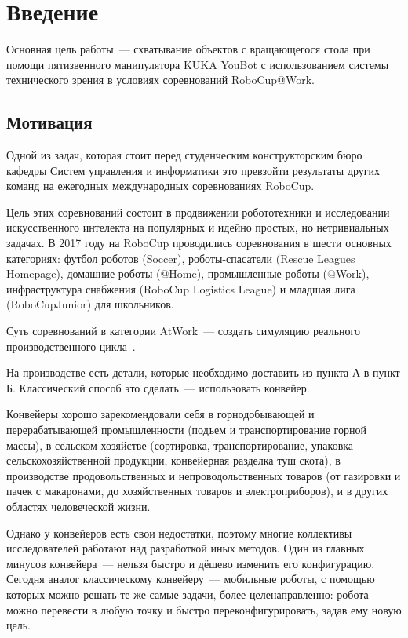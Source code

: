 \section*{Введение}

Основная цель работы~--- схватывание объектов с вращающегося стола  при помощи пятизвенного манипулятора KUKA YouBot с использованием системы технического зрения в условиях соревнований RoboCup@Work.


\subsection*{Мотивация}

Одной из задач, которая стоит перед студенческим конструкторским бюро кафедры Систем управления и информатики это превзойти результаты других команд на ежегодных международных соревнованиях RoboCup.

Цель этих соревнований состоит в продвижении робототехники и исследовании искусственного интелекта на популярных и идейно простых, но нетривиальных задачах. В 2017 году на RoboCup проводились соревнования в шести основных категориях: футбол роботов (Soccer), роботы-спасатели (Rescue Leagues Homepage), домашние роботы (@Home), промышленные роботы (@Work), инфраструктура снабжения (RoboCup Logistics League) и младшая лига (RoboCupJunior) для школьников. 

Суть соревнований в категории AtWork~--- создать симуляцию реального производственного цикла~\cite{kraetzschmar2014robocup}. 

На производстве есть детали, которые необходимо доставить из пункта А в пункт Б. Классический способ это сделать~--- использовать конвейер. 

Конвейеры хорошо зарекомендовали себя в горнодобывающей и перерабатывающей промышленности (подъем и транспортирование горной массы), в сельском хозяйстве (сортировка, транспортирование, упаковка сельскохозяйственной продукции, конвейерная разделка туш скота), в производстве продовольственных и непроводольственных товаров (от газировки и пачек с макаронами, до хозяйственных товаров и электроприборов), и в других областях человеческой жизни.%

Однако у конвейеров есть свои недостатки, поэтому многие коллективы исследователей работают над разработкой иных методов. Один из главных минусов конвейера~--- нельзя быстро и дёшево изменить его конфигурацию. Сегодня аналог классическому конвейеру~--- мобильные роботы, с помощью которых можно решать те же самые задачи, более целенаправленно: робота можно перевести в любую точку и быстро переконфигурировать, задав ему новую цель. 

